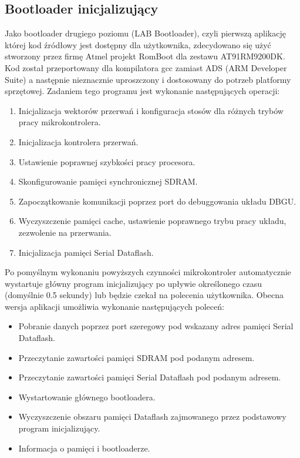 \documentclass[a4paper,12pt]{book}
\begin{document}
			\subsection{Bootloader inicjalizujący}
				\label{sec:bootloader2nd}
				Jako bootloader drugiego poziomu (LAB Bootloader), czyli pierwszą aplikację której kod źródłowy jest dostępny dla użytkownika, zdecydowano się użyć stworzony przez firmę Atmel projekt RomBoot dla zestawu AT91RM9200DK\cite{website:arm_booting}. Kod został przeportowany dla kompilatora gcc zamiast ADS (ARM Developer Suite) a następnie nieznacznie uproszczony i dostosowany do potrzeb platformy sprzętowej. Zadaniem tego programu jest wykonanie następujących operacji:
				\begin{enumerate}
					\item Inicjalizacja wektorów przerwań i konfiguracja stosów dla różnych trybów pracy mikrokontrolera.
					\item Inicjalizacja kontrolera przerwań.
					\item Ustawienie poprawnej szybkości pracy procesora.
					\item Skonfigurowanie pamięci synchronicznej SDRAM.
					\item Zapoczątkowanie komunikacji poprzez port do debuggowania układu DBGU.
					\item Wyczyszczenie pamięci cache, ustawienie poprawnego trybu pracy układu, zezwolenie na przerwania.
					\item Inicjalizacja pamięci Serial Dataflash.
				\end{enumerate}
				Po pomyślnym wykonaniu powyższych czynności mikrokontroler automatycznie wystartuje główny program inicjalizujący po upływie określonego czasu (domyślnie 0.5 sekundy) lub będzie czekał na polecenia użytkownika. Obecna wersja aplikacji umożliwia wykonanie następujących poleceń:
				\begin{itemize}
					\item Pobranie danych poprzez port szeregowy pod wskazany adres pamięci Serial Dataflash.
					\item Przeczytanie zawartości pamięci SDRAM pod podanym adresem.
					\item Przeczytanie zawartości pamięci Serial Dataflash pod podanym adresem.
					\item Wystartowanie głównego bootloadera.
					\item Wyczyszczenie obszaru pamięci Dataflash zajmowanego przez podstawowy program inicjalizujący.
					\item Informacja o pamięci i bootloaderze.
				\end{itemize}
\end{document}
